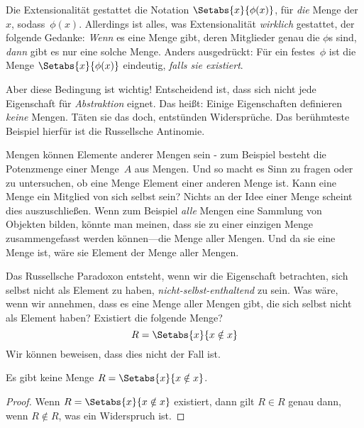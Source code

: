 \documentclass[../../../include/open-logic-section]{subfiles}
\begin{document}

Die Extensionalität gestattet die Notation $\Setabs{x}{\phi(x)}$, für
\emph{die} Menge der $x$, sodass~$\phi(x)$. Allerdings ist alles, was
Extensionalität \emph{wirklich} gestattet, der folgende Gedanke:
\emph{Wenn} es eine Menge gibt, deren Mitglieder genau die $\phi$s sind,
\emph{dann} gibt es nur eine solche Menge. Anders ausgedrückt: Für ein festes~$\phi$
ist die Menge $\Setabs{x}{\phi(x)}$ eindeutig, \emph{falls sie
existiert}.

Aber diese Bedingung ist wichtig!{} Entscheidend ist, dass sich nicht jede Eigenschaft
für \emph{Abstraktion} eignet. Das heißt: Einige Eigenschaften definieren \emph{keine} Mengen.
Täten sie das doch, entstünden Widersprüche. Das berühmteste Beispiel hierfür ist die Russellsche
Antinomie.

Mengen können Elemente anderer Mengen sein - zum Beispiel besteht die Potenzmenge
einer Menge~$A$ aus Mengen. Und so macht es Sinn zu fragen oder
zu untersuchen, ob eine Menge Element einer anderen Menge ist. Kann eine Menge
ein Mitglied von sich selbst sein? Nichts an der Idee einer Menge scheint dies auszuschließen.
Wenn zum Beispiel \emph{alle} Mengen eine Sammlung von
Objekten bilden, könnte man meinen, dass sie zu einer einzigen Menge
zusammengefasst werden können---die Menge aller Mengen. 
Und da sie eine Menge ist, wäre sie Element der Menge aller Mengen. 

Das Russellsche Paradoxon entsteht, wenn wir die Eigenschaft betrachten,
sich selbst nicht als Element zu haben, \emph{nicht-selbst-enthaltend} zu sein.
Was wäre, wenn wir annehmen,
dass es eine Menge aller Mengen gibt, die sich selbst nicht als
Element haben? Existiert die folgende Menge?
\[
R = \Setabs{x}{x \notin x}
\]
 Wir können beweisen, dass dies nicht der Fall ist.

\begin{thm}
	Es gibt keine Menge $R = \Setabs{x}{x \notin x}$.
\end{thm}

\begin{proof}
Wenn $R = \Setabs{x}{x \notin x}$ existiert, dann gilt
$R \in R$ genau dann, wenn $R \notin R$, was ein Widerspruch ist.
\end{proof}
\end{document}
